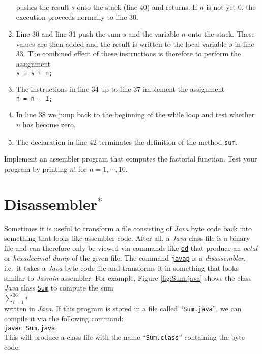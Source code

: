 \begin{enumerate}
      pushes the result $s$ onto the stack (line 40) and returns.  If $n$ is not yet $0$, the
      execution proceeds normally to line 30.
\item Line 30 and line 31 push the sum $s$ and the variable $n$ onto the stack.  These
      values are then added and the result is written to the local variable $s$ in line 33.
      The combined effect of these instructions is therefore to perform the assignment
      \\[0.2cm]
      \hspace*{1.3cm}
      \texttt{s = s + n;}
\item The instructions in line 34 up to line 37 implement the assignment 
      \\[0.2cm]
      \hspace*{1.3cm}
      \texttt{n = n - 1;}
\item In line 38 we jump back to the beginning of the while loop and test whether $n$ has become
      zero.  
\item The declaration in line 42 terminates the definition of the method \texttt{sum}.
\end{enumerate}

\exerciseEng
Implement an assembler program that computes the factorial function.  Test your program by printing
$n!$ for $n = 1, \cdots, 10$.

\section{Disassembler$^*$}
Sometimes it is useful to transform a file consisting of \textsl{Java} byte code back into something
that looks like assembler code.  After all, a \textsl{Java} class file is a binary file and can
therefore only be viewed via commands like \href{http://en.wikipedia.org/wiki/Od_(Unix)}{\texttt{od}} 
that produce an \emph{octal} or \emph{hexadecimal dump} of the given file.  The command
\href{http://docs.oracle.com/javase/7/docs/technotes/tools/windows/javap.html}{\texttt{javap}} 
is a \emph{disassembler},  i.e.~it takes a \textsl{Java} byte code file and transforms it in
something that looks similar to \textsl{Jasmin} assembler.  For example, Figure \ref{fig:Sum.java}
shows the class \textsl{Java} class
\href{https://github.com/karlstroetmann/Formal-Languages/tree/master/Jasmin/Sum.java}{\texttt{Sum}}
 to compute the sum 
\\[0.2cm]
\hspace*{1.3cm}
$\sum\limits_{i=1}^{36} i$
\\[0.2cm]
written in \textsl{Java}.  If this program is
stored in a file called ``\texttt{Sum.java}'', we can compile it via the following command:
\\[0.2cm]
\hspace*{1.3cm}
\texttt{javac Sum.java}
\\[0.2cm]
This will produce a class file with the name ``\texttt{Sum.class}'' containing the byte code.

